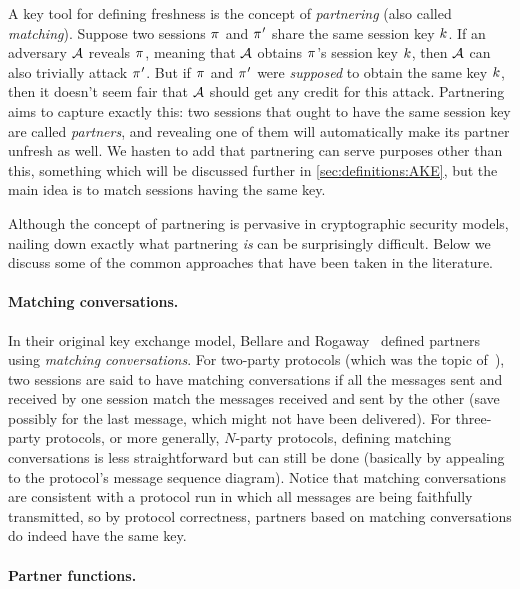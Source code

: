 A key tool for defining freshness is the concept of \emph{partnering}
(also called \emph{matching}).
Suppose two sessions $\oracle$ and $\oracle'$ share the same session key $k$.
If an adversary $\mathcal{A}$ reveals $\oracle$,
meaning that $\mathcal{A}$ obtains $\oracle$'s session key $k$,
then $\mathcal{A}$ can also trivially attack $\oracle'$.
But if $\oracle$ and $\oracle'$ were \emph{supposed} to obtain the same key $k$,
then it doesn't seem fair that $\mathcal{A}$ should get any credit for this attack.
Partnering aims to capture exactly this:
two sessions that ought to have the same session key are called \emph{partners},
and revealing one of them will automatically make its partner unfresh as well.
We hasten to add that partnering can serve purposes other than this,
something which will be discussed further in \cref{sec:definitions:AKE},
but the main idea is to match sessions having the same key.

Although the concept of partnering is pervasive in cryptographic security models,
nailing down exactly what partnering \emph{is} can be surprisingly difficult.
Below we discuss some of the common approaches that have been taken in the literature.

\paragraph{Matching conversations.}
In their original key exchange model,
Bellare and Rogaway~\cite{C:BelRog93} defined partners using \emph{matching conversations}.
For two-party protocols
(which was the topic of~\cite{C:BelRog93}),
two sessions are said to have matching conversations if all the messages sent and received by one session match the messages received and sent by the other
(save possibly for the last message, which might not have been delivered).
For three-party protocols,
or more generally, $N$-party protocols,
defining matching conversations is less straightforward but can still be done
(basically by appealing to the protocol's message sequence diagram).
Notice that matching conversations are consistent with a protocol run in which all messages are being faithfully transmitted,
so by protocol correctness,
partners based on matching conversations do indeed have the same key.




\paragraph{Partner functions.}

